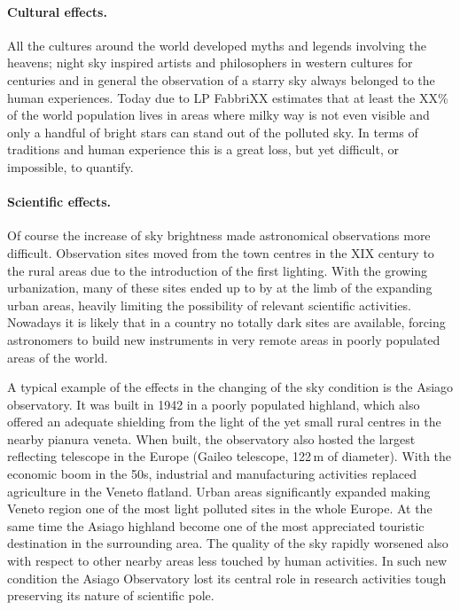 \documentclass[a4paper, titlepage, 10pt]{book}
\begin{document}
\paragraph{Cultural effects.} All the cultures around the world developed myths and legends involving the heavens; night sky inspired artists and philosophers in western cultures for centuries and in general the observation of a starry sky always belonged to the human experiences. Today due to LP FabbriXX estimates that at least the XX\% of the world population lives in areas where milky way is not even visible and only a handful of bright stars can stand out of the polluted sky. In terms of traditions and human experience this is a great loss, but yet difficult, or impossible, to quantify.

\paragraph{Scientific effects.} Of course the increase of sky brightness made astronomical observations more difficult. Observation sites moved from the town centres in the XIX century to the rural areas due to the introduction of the first lighting. With the growing urbanization, many of these sites ended up to by at the limb of the expanding urban areas, heavily limiting the possibility of relevant scientific activities. Nowadays it is likely that in a country no totally dark sites are available, forcing astronomers to build new instruments in very remote areas in poorly populated areas of the world.

A typical example of the effects in the changing of the sky condition is the Asiago observatory. It was built in 1942 in a poorly populated highland, which also offered an adequate shielding from the light of the yet small rural centres in the nearby pianura veneta. When built, the observatory also hosted the largest reflecting telescope in the Europe (Gaileo telescope, 122\,m of diameter).
With the economic boom in the 50s, industrial and manufacturing activities replaced agriculture in the Veneto flatland. Urban areas significantly expanded making Veneto region one of the most light polluted sites in the whole Europe. At the same time the Asiago highland become one of the most appreciated touristic destination in the surrounding area. The quality of the sky rapidly worsened also with respect to other nearby areas less touched by human activities. In such new condition the Asiago Observatory lost its central role in research activities tough preserving its nature of scientific pole.
\end{document}
